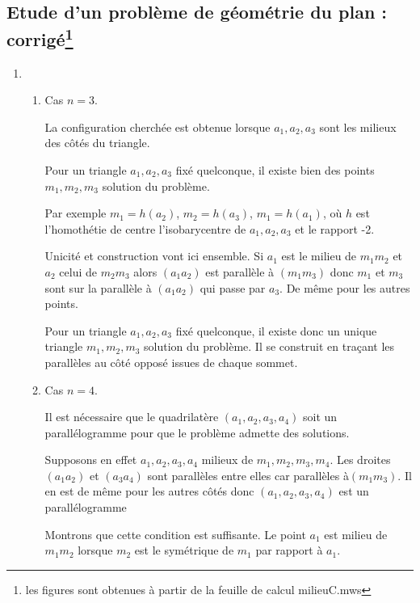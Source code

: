 \subsection*{Etude d'un problème de géométrie du plan : corrigé\footnote {les figures sont obtenues à partir de la feuille de calcul milieuC.mws}}
\begin{enumerate}
\item \begin{enumerate}
\item
Cas $n=3$.

La configuration cherchée est obtenue lorsque $a_{1},a_{2},a_{3}$ sont les milieux des côtés du triangle.

Pour un triangle $a_{1},a_{2},a_{3}$ fixé quelconque, il existe bien des points $m_{1},m_{2},m_{3}$ solution du problème.

Par exemple
$m_{1}=h(a_{2})$, $m_{2}=h(a_{3})$, $m_{1}=h(a_{1})$, où $h$ est l'homothétie de centre l'isobarycentre de $a_{1},a_{2},a_{3}$ et le rapport -2.

Unicité et construction vont ici ensemble. Si $a_{1}$ est le milieu de $m_{1}m_{2}$ et $a_{2}$ celui de $m_{2}m_{3}$ alors $(a_{1}a_{2})$ est parallèle à $(m_{1}m_{3})$ donc $m_{1}$ et $m_{3}$ sont sur la parallèle à $(a_{1}a_{2})$ qui passe par $a_{3}$. De même pour les autres points.

Pour un triangle $a_{1},a_{2},a_{3}$ fixé quelconque, il existe donc un unique triangle $m_{1},m_{2},m_{3}$ solution du problème. Il se construit en traçant les parallèles au côté opposé issues de chaque sommet.

\item
Cas $n=4$.

Il est nécessaire que le quadrilatère $ (a_{1},a_{2}, a_{3},a_{4})$ soit un parallélogramme pour que le problème admette des solutions.

Supposons en effet $a_{1},a_{2},a_{3},a_{4}$ milieux de $m_{1},m_{2},m_{3},m_{4}$. Les droites $ (a_{1}a_{2})$ et $ (a_{3}a_{4})$ sont parallèles entre elles car parallèles à$ (m_{1}m_{3})$. Il en est de même pour les autres côtés donc $ (a_{1},a_{2}, a_{3},a_{4})$ est un parallélogramme

Montrons que cette condition est suffisante. Le point $a_{1}$ est milieu de $m_{1}m_{2}$ lorsque $m_{2}$ est le symétrique de $m_{1}$ par rapport à $a_{1}$.


\end{enumerate}
\end{enumerate}
